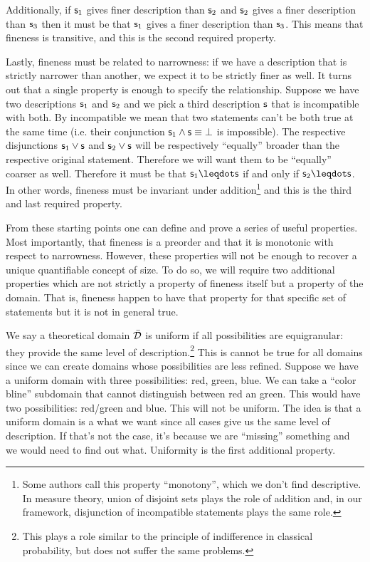 \documentclass{article}
\begin{document}
Additionally, if $\mathsf{s}_1$ gives finer description than $\mathsf{s}_2$ and $\mathsf{s}_2$ gives a finer description than $\mathsf{s}_3$ then it must be that $\mathsf{s}_1$ gives a finer description than $\mathsf{s}_3$. This means that fineness is transitive, and this is the second required property.

Lastly, fineness must be related to narrowness: if we have a description that is strictly narrower than another, we expect it to be strictly finer as well. It turns out\cite{definetti} that a single property is enough to specify the relationship. Suppose we have two descriptions $\mathsf{s}_1$ and $\mathsf{s}_2$ and we pick a third description $\mathsf{s}$ that is incompatible with both. By incompatible we mean that two statements can't be both true at the same time (i.e. their conjunction $\mathsf{s}_1 \wedge \mathsf{s} \equiv \bot$ is impossible). The respective disjunctions $\mathsf{s}_1 \vee \mathsf{s}$ and $\mathsf{s}_2 \vee \mathsf{s}$ will be respectively ``equally'' broader than the respective original statement. Therefore we will want them to be ``equally'' coarser as well. Therefore it must be that $\stmt_1 \finer \stmt$ if and only if $\stmt_2 \finer \stmt$. In other words, fineness must be invariant under addition\footnote{Some authors call this property ``monotony'', which we don't find descriptive. In measure theory, union of disjoint sets plays the role of addition and, in our framework, disjunction of incompatible statements plays the same role.} and this is the third and last required property.

From these starting points one can define and prove a series of useful properties. Most importantly, that fineness is a preorder and that it is monotonic with respect to narrowness. However, these properties will not be enough to recover a unique quantifiable concept of size. To do so, we will require two additional properties which are not strictly a property of fineness itself but a property of the domain. That is, fineness happen to have that property for that specific set of statements but it is not in general true.

We say a theoretical domain $\bar{\mathcal{D}}$ is uniform if all possibilities are equigranular: they provide the same level of description.\footnote{This plays a role similar to the principle of indifference in classical probability, but does not suffer the same problems.} This is cannot be true for all domains since we can create domains whose possibilities are less refined. Suppose we have a uniform domain with three possibilities: red, green, blue. We can take a ``color bline'' subdomain that cannot distinguish between red an green. This would have two possibilities: red/green and blue. This will not be uniform. The idea is that a uniform domain is a what we want since all cases give us the same level of description. If that's not the case, it's because we are ``missing'' something and we would need to find out what. Uniformity is the first additional property.
\end{document}
